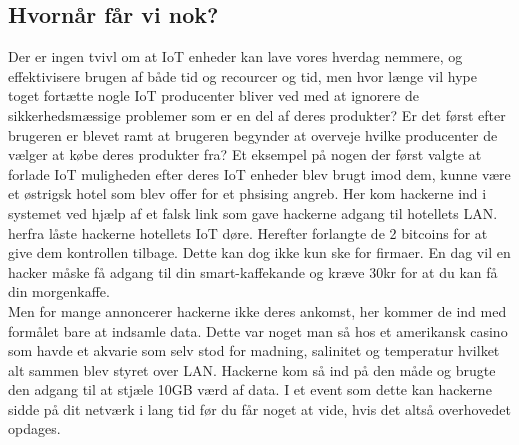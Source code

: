     \subsection {Hvornår får vi nok?}
    Der er ingen tvivl om at IoT enheder kan lave vores hverdag nemmere, og effektivisere brugen af både tid og recourcer og tid, men hvor længe vil hype toget fortætte nogle IoT producenter bliver ved med at ignorere de sikkerhedsmæssige problemer som er en del af deres produkter? Er det først efter brugeren er blevet ramt at brugeren begynder at overveje hvilke producenter de vælger at købe deres produkter fra? Et eksempel på nogen der først valgte at forlade IoT muligheden efter deres IoT enheder blev brugt imod dem, kunne være et østrigsk hotel som blev offer for et phsising angreb. Her kom hackerne ind i systemet ved hjælp af et falsk link som gave hackerne adgang til hotellets LAN. herfra låste hackerne hotellets IoT døre. Herefter forlangte de 2 bitcoins for at give dem kontrollen tilbage. Dette kan dog ikke kun ske for firmaer. En dag vil en hacker måske få adgang til din smart-kaffekande og kræve 30kr for at du kan få din morgenkaffe.\\
    Men for mange annoncerer hackerne ikke deres ankomst, her kommer de ind med formålet bare at indsamle data. Dette var noget man så hos et amerikansk casino som havde et akvarie som selv stod for madning, salinitet og temperatur hvilket alt sammen blev styret over LAN. Hackerne kom så ind på den måde og brugte den adgang til at stjæle 10GB værd af data. I et event som dette kan hackerne sidde på dit netværk i lang tid før du får noget at vide, hvis det altså overhovedet opdages.\autocite{Examples}
    
    
    
   
       

